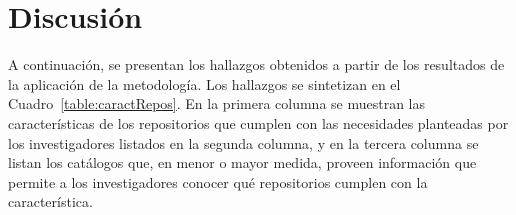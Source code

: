 \documentclass[runningheads]{llncs}
\def \bchregi {\begin{color}{red}}
\def \echregi {\end{color}}
\def \bchgon {\begin{color}{blue}}
\def \echgon {\end{color}}
\begin{document}





\section{Discusión}

A continuación, se presentan los hallazgos obtenidos a partir de los resultados de la aplicación de la metodología. Los hallazgos se sintetizan en el Cuadro~\ref{table:caractRepos}. En la primera columna se muestran las características de los repositorios que cumplen con las necesidades planteadas por los investigadores listados en la segunda columna, y en la tercera columna se listan los catálogos que, en menor o mayor medida, proveen información que permite a los investigadores conocer qué repositorios cumplen con la característica.  
\end{document}
